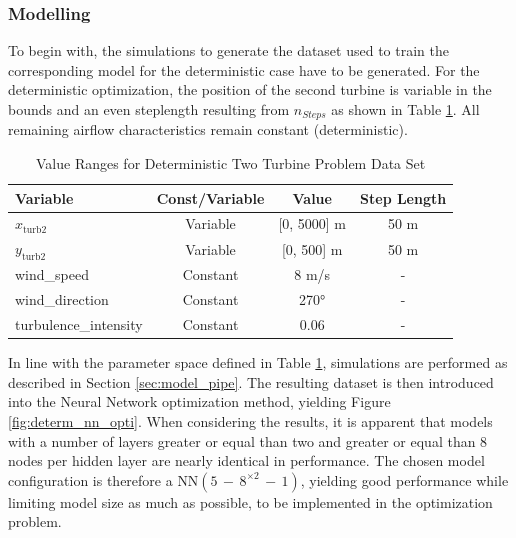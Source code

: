 \subsubsection{Modelling}

To begin with, the simulations to generate the dataset used to train the corresponding model for the deterministic case have to be generated. For the deterministic optimization, the position of the second turbine is variable in the bounds and an even steplength resulting from $n_{Steps}$ as shown in Table \ref{tab:val_determ_data}. All remaining airflow characteristics remain constant (deterministic).

\begin{table}[ht]
	\centering
	\caption{Value Ranges for Deterministic Two Turbine Problem Data Set}
	\begin{tabular}{|l|c|c|c|}
		\hline
		\textbf{Variable} & \textbf{Const/Variable} & \textbf{Value} & Step Length\\
		\hline
		$x_{\text{turb2}}$ & Variable & [0, 5000] m & 50 m\\
		$y_{\text{turb2}}$ & Variable & [0, 500] m & 50 m \\
		wind\_speed & Constant & 8 m/s & -\\
		wind\_direction & Constant & 270°&- \\
		turbulence\_intensity & Constant & 0.06 & - \\
		\hline
	\end{tabular}

	\label{tab:val_determ_data}
\end{table}

In line with the parameter space defined in Table \ref{tab:val_determ_data}, simulations are performed as described in Section \ref{sec:model_pipe}. The resulting dataset is then introduced into the Neural Network optimization method, yielding Figure \ref{fig:determ_nn_opti}. When considering the results, it is apparent that models with a number of layers greater or equal than two and greater or equal than 8 nodes per hidden layer are nearly identical in performance. The chosen model configuration is therefore a $\text{NN}(5\,{-}\,8^{\times2}\,{-}\,1)$, yielding good performance while limiting model size as much as possible, to be implemented in the optimization problem. 

